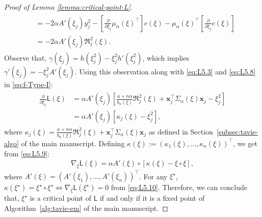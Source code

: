 \documentclass[12pt]{article}
\numberwithin{equation}{section}
\begin{document}
\begin{proof}[Proof of Lemma \ref{lemma:critical-point-L}]
\begin{align}
\begin{split}
        &= -2\alpha A'(\xi_j) y_j^2 - \left[\frac{\partial}{\partial\xi_j}\mu_{\alpha}(\xi)^{\top}\right]c(\xi) - \mu_{\alpha}(\xi)^{\top}\left[\frac{\partial}{\partial\xi_j}c(\xi)\right]\\
        &= -2\alpha A'(\xi_j)\mathfrak{R}^{2}_j(\xi).
    \end{split}
\end{align}
Observe that, $\gamma(\xi_j) = h(\xi_j^2) - \xi_j^2h'(\xi_j^2)$, which implies $\gamma'(\xi_j) = -\xi_j^2 A'(\xi_j)$. Using this observation along with \eqref{eq:L5.3} and \eqref{eq:L5.8} in \eqref{eq:f-Type-I}:
\begin{align}\label{eq:L5.9}
    \begin{split}
        \frac{\partial}{\partial \xi_j}\mathsf{L}(\xi) &= \alpha A'(\xi_j)\left[\frac{a+n\alpha}{b_{\alpha}(\xi)}\mathfrak{R}^{2}_j(\xi) + \mathbf{x}_j^{\top}\Sigma_{\alpha}(\xi)\mathbf{x}_j - \xi_j^{2}\right]\\
        &= \alpha A'(\xi_j)\left[\kappa_j(\xi) - \xi_j^2\right],
    \end{split}
\end{align}
where $\kappa_j(\xi) = \frac{a+n\alpha}{b_{\alpha}(\xi)}\mathfrak{R}^{2}_j(\xi) + \mathbf{x}_j^{\top}\Sigma_{\alpha}(\xi)\mathbf{x}_j$ as defined in Section~\ref{subsec:tavie-algo} of the main manuscript. Defining $\kappa(\xi) := (\kappa_1(\xi),\ldots,\kappa_n(\xi))^{\top}$, we get from \eqref{eq:L5.9}:
\begin{align}\label{eq:L5.10}
    \nabla_{\xi}\mathsf{L}(\xi) = \alpha A'(\xi)\circ \left[ \kappa(\xi) - \xi \circ \xi\right],
\end{align}
where $A'(\xi) = (A'(\xi_1), \ldots, A'(\xi_n))^{\top}$. For any $\xi^{\star}$,  $\kappa(\xi^{\star}) = \xi^{\star} \circ \xi^{\star} \iff \nabla_{\xi}\mathsf{L}(\xi^{\star}) = 0$ from \eqref{eq:L5.10}. Therefore, we can conclude that, $\xi^{\star}$ is a critical point of $\mathsf{L}$ if and only if it is a fixed point of Algorithm~\ref{alg:tavie-em} of the main manuscript.

\noindent


\end{proof}
\end{document}
